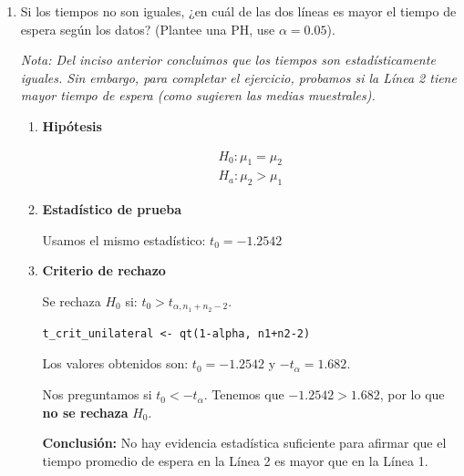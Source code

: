 \documentclass[12pt,a4paper]{article}
\begin{document}
\begin{enumerate}
\begin{enumerate}
\begin{enumerate}
      Los valores obtenidos son: \( \overline{X}_1 = 3.6605\), \(\overline{X}_2 = 3.9958\), \(S_p = 1.0257\), \(t_0 = -1.0798\) y \(t_{critico} = 2.0181\).
      
      Nos preguntamos si $|t_0| > t_{critico}$. Tenemos que $|{-1.0798}| = 1.2542 < 2.0181$, por lo que \textbf{no se rechaza} $H_0$. 
      
      \textbf{Conclusión:} No hay evidencia estadística que indique que los tiempos promedio de espera son diferentes entre ambas líneas del Metro.
    \end{enumerate}

    \item Si los tiempos no son iguales, ¿en cuál de las dos líneas es mayor el tiempo de espera según los datos? (Plantee una PH, use $\alpha=0.05$).
    
    \textit{Nota: Del inciso anterior concluimos que los tiempos son estadísticamente iguales. Sin embargo, para completar el ejercicio, probamos si la Línea 2 tiene mayor tiempo de espera (como sugieren las medias muestrales).}
    
    \begin{enumerate}
      \item \textbf{Hipótesis}
      
      \[
        \begin{array}{c}
          H_0 : \mu_1 = \mu_2 \\
          H_a : \mu_2 > \mu_1
        \end{array}
      \]

      \item \textbf{Estadístico de prueba}
      
      Usamos el mismo estadístico: $t_0 = -1.2542$
      
      \item \textbf{Criterio de rechazo}
      
      Se rechaza $H_0$ si: $t_0 > t_{\alpha, n_1+n_2-2}$. 
      
      \begin{lstlisting}
t_crit_unilateral <- qt(1-alpha, n1+n2-2)
      \end{lstlisting}

      Los valores obtenidos son: $t_0 = -1.2542$ y $-t_{\alpha} = 1.682$.
      
      Nos preguntamos si $t_0 < -t_{\alpha}$. Tenemos que $-1.2542 > 1.682$, por lo que \textbf{no se rechaza} $H_0$. 
      
      \textbf{Conclusión:} No hay evidencia estadística suficiente para afirmar que el tiempo promedio de espera en la Línea 2 es mayor que en la Línea 1.
    \end{enumerate}
  \end{enumerate}
\end{enumerate}
\end{document}
